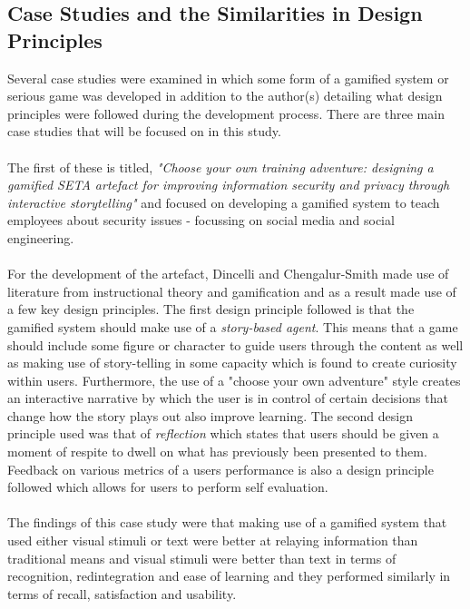\documentclass[conference]{IEEEtran}
\begin{document}
\subsection{Case Studies and the Similarities in Design Principles}
Several case studies were examined in which some form of a gamified system or serious game was developed in addition to the author(s) detailing what design principles were followed during the development process. There are three main case studies that will be focused on in this study\cite{Dincelli2020,Sheng2007,allers2021children}.
\\\\
The first of these is titled, \textit{"Choose your own training adventure: designing a gamified SETA artefact for improving information security and privacy through interactive storytelling"} and focused on developing a gamified system to teach employees about security issues - focussing on social media and social engineering\cite{Dincelli2020}. 
\\\\
For the development of the artefact, Dincelli and Chengalur-Smith\cite{Dincelli2020} made use of literature from instructional theory and gamification and as a result made use of a few key design principles. The first design principle followed is that the gamified system should make use of a \textit{story-based agent}\cite{Dincelli2020}. This means that a game should include some figure or character to guide users through the content as well as making use of story-telling in some capacity which is found to create curiosity within users\cite{Dincelli2020, Kapp2012a}. Furthermore, the use of a "choose your own adventure" style creates an interactive narrative by which the user is in control of certain decisions that change how the story plays out also improve learning\cite{Dincelli2020}. The second design principle used was that of \textit{reflection} which states that users should be given a moment of respite to dwell on what has previously been presented to them\cite{Dincelli2020,Sheng2007}. Feedback on various metrics of a users performance is also a design principle followed which allows for users to perform self evaluation\cite{Dincelli2020}. 
\\\\
The findings of this case study were that making use of a gamified system that used either visual stimuli or text were better at relaying information than traditional means and visual stimuli were better than text in terms of recognition, redintegration and ease of learning and they performed similarly in terms of recall, satisfaction and usability\cite{Dincelli2020}.
\end{document}
